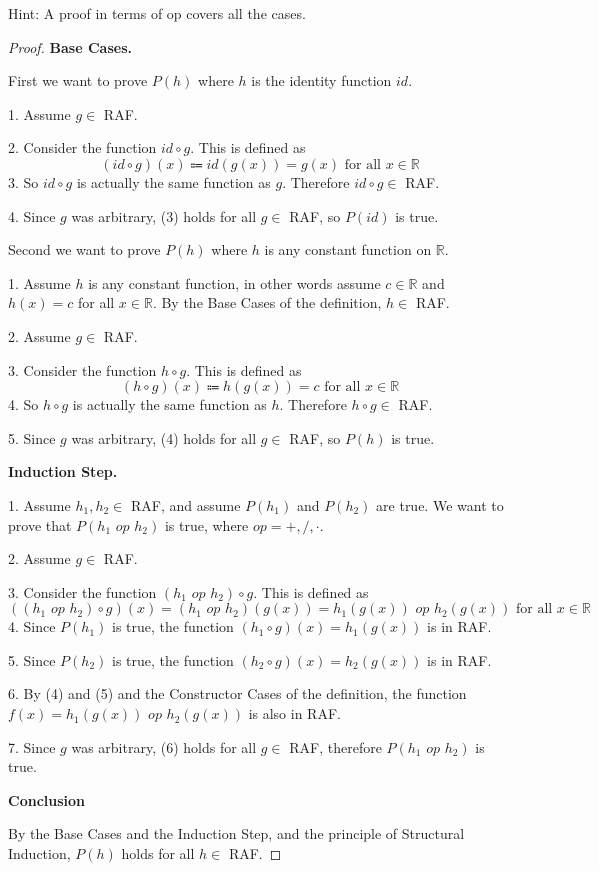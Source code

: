 \documentclass[14pt]{extarticle}
\begin{document}
Hint: A proof in terms of op covers all the cases.
\begin{proof}
{\bf Base Cases.} 

First we want to prove $P(h)$ where $h$ is the identity function $id$.

1. Assume $g \in$ RAF.

2. Consider the function $id \circ g$. This is defined as
$$
(id \circ g)(x) \Coloneqq id(g(x)) = g(x) \text{ for all } x \in \mathbb{R}
$$
3. So $id \circ g$ is actually the same function as $g$. Therefore $id \circ g \in$ RAF.

4. Since $g$ was arbitrary, (3) holds for all $g \in$ RAF, so $P(id)$ is true.

Second we want to prove $P(h)$ where $h$ is any constant function on $\mathbb{R}$.

1. Assume $h$ is any constant function, in other words assume $c \in \mathbb{R}$ and $h(x) = c$ for all $x \in \mathbb{R}$. By the Base Cases of the definition, $h \in$ RAF.

2. Assume $g \in$ RAF.

3. Consider the function $h \circ g$. This is defined as
$$
(h \circ g)(x) \Coloneqq h(g(x)) = c \text{ for all } x \in \mathbb{R}
$$
4. So $h \circ g$ is actually the same function as $h$. Therefore $h \circ g \in$ RAF.

5. Since $g$ was arbitrary, (4) holds for all $g \in$ RAF, so $P(h)$ is true.

{\bf Induction Step.}

1. Assume $h_1, h_2 \in$ RAF, and assume $P(h_1)$ and $P(h_2)$ are true. We want to prove that $P(h_1 \,\, op \,\, h_2)$ is true, where $op = +, /, \cdot$.

2. Assume $g \in$ RAF.

3. Consider the function $(h_1 \,\, op \,\, h_2) \circ g$. This is defined as
$$
((h_1 \,\, op \,\, h_2) \circ g)(x) = (h_1 \,\, op \,\, h_2)(g(x)) = h_1(g(x)) \,\, op \,\, h_2(g(x))\text{ for all } x \in \mathbb{R}
$$
4. Since $P(h_1)$ is true, the function $(h_1 \circ g)(x) = h_1(g(x))$ is in RAF.

5. Since $P(h_2)$ is true, the function $(h_2 \circ g)(x) = h_2(g(x))$ is in RAF.

6. By (4) and (5) and the Constructor Cases of the definition, the function $f(x) = h_1(g(x)) \,\, op \,\, h_2(g(x))$ is also in RAF.

7. Since $g$ was arbitrary, (6) holds for all $g \in$ RAF, therefore $P(h_1 \,\, op \,\, h_2)$ is true.

{\bf Conclusion}

By the Base Cases and the Induction Step, and the principle of Structural Induction, $P(h)$ holds for all $h \in$ RAF.
\end{proof}
\end{document}
